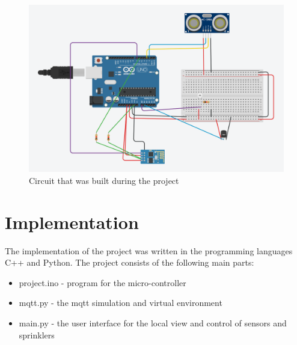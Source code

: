 \documentclass{article}
\begin{document}
\begin{figure}
\centering
\includegraphics[scale=0.3]{scheme_cropped.png}
\caption{Circuit that was built during the project}
\label{fig:scheme}
\end{figure}

\section{Implementation}
The implementation of the project was written in the programming languages C++ and Python. The project consists of the following main parts:
\begin{itemize}
\item project.ino - program for the micro-controller
\item mqtt.py - the mqtt simulation and virtual environment
\item main.py - the user interface for the local view and control of sensors and sprinklers
\end{itemize}
\end{document}
